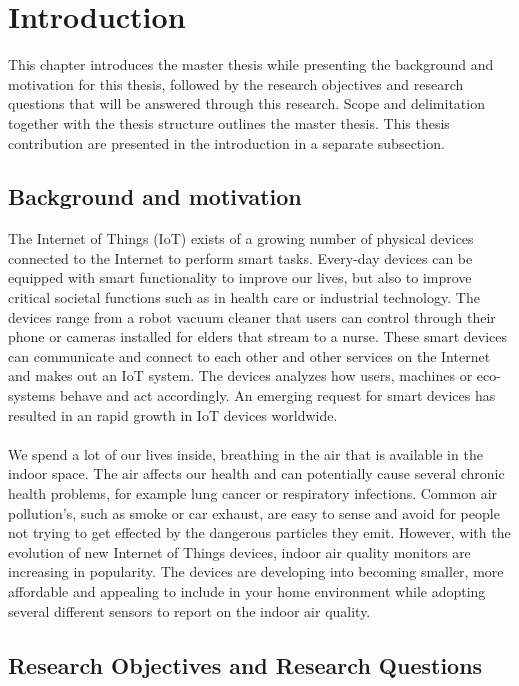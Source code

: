 \chapter*{Introduction}
This chapter introduces the master thesis while presenting the background and motivation for this thesis, followed by the research objectives and research questions that will be answered through this research. Scope and delimitation together with the thesis structure outlines the master thesis. This thesis contribution are presented in the introduction in a separate subsection. 
\section*{Background and motivation}
The Internet of Things (IoT) exists of a growing number of physical devices connected to the Internet to perform smart tasks. \cite{IoTSurveyAl-Fuqaha} Every-day devices can be equipped with smart functionality to improve our lives, but also to improve critical societal functions such as in health care or industrial technology. The devices range from a robot vacuum cleaner that users can control through their phone or cameras installed for elders that stream to a nurse. These smart devices can communicate and connect to each other and other services on the Internet and makes out an IoT system. The devices analyzes how users, machines or eco-systems behave and act accordingly. An emerging request for smart devices has resulted in an rapid growth in IoT devices worldwide. \cite{IoTAndPrivacy}
\\\\
We spend a lot of our lives inside, breathing in the air that is available in the indoor space. \cite{IndoorAirQualityMonitorIoT} The air affects our health and can potentially cause several chronic health problems, for example lung cancer or respiratory infections. \cite{IAQMonitorReview} Common air pollution's, such as smoke or car exhaust,  are easy to sense and avoid for people not trying to get effected by the dangerous particles they emit. However, with the evolution of new Internet of Things devices, indoor air quality monitors are increasing in popularity. \cite{SecurityAndDataIntInAQM} The devices are developing into becoming smaller, more affordable and appealing to include in your home environment while adopting several different sensors to report on the indoor air quality. 

\section*{Research Objectives and Research Questions}

